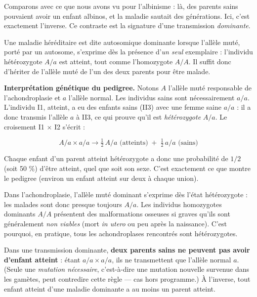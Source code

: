 \documentclass[11pt]{article}
\newcommand{\cle}[1]{{\popxbold\color{popdark}#1}}
\begin{document}
Comparons avec ce que nous avons vu pour l'albinisme : là, des parents sains pouvaient avoir un enfant albinos, et la maladie sautait des générations. Ici, c'est exactement l'inverse. Ce contraste est la signature d'une transmission \emph{dominante}.

\begin{definition}
Une maladie héréditaire est dite \cle{autosomique dominante} lorsque l'allèle muté, porté par un autosome, s'exprime dès la présence d'\emph{un seul} exemplaire : l'individu \cle{hétérozygote} $A/a$ est atteint, tout comme l'homozygote $A/A$. Il suffit donc d'hériter de l'allèle muté de l'un des deux parents pour être malade.
\end{definition}

\textbf{Interprétation génétique du pedigree.} Notons $A$ l'allèle muté responsable de l'achondroplasie et $a$ l'allèle normal. Les individus sains sont nécessairement $a/a$. L'individu I1, atteint, a eu des enfants sains (II3) avec une femme saine $a/a$ : il a donc transmis l'allèle $a$ à II3, ce qui prouve qu'il est \emph{hétérozygote} $A/a$. Le croisement I1 $\times$ I2 s'écrit :

\[ A/a \times a/a \longrightarrow \tfrac{1}{2}\, A/a \text{ (atteints)} \;+\; \tfrac{1}{2}\, a/a \text{ (sains)} \]

Chaque enfant d'un parent atteint hétérozygote a donc une probabilité de $1/2$ (soit 50 \%) d'être atteint, quel que soit son sexe. C'est exactement ce que montre le pedigree (environ un enfant atteint sur deux à chaque union).

\begin{aretenir}
Dans l'achondroplasie, l'allèle muté dominant s'exprime dès l'état \cle{hétérozygote} : les malades sont donc presque toujours $A/a$. Les individus \cle{homozygotes dominants} $A/A$ présentent des malformations osseuses si graves qu'ils sont généralement \emph{non viables} (mort \emph{in utero} ou peu après la naissance). C'est pourquoi, en pratique, tous les achondroplases rencontrés sont hétérozygotes.
\end{aretenir}

\begin{propriete}
Dans une transmission dominante, \textbf{deux parents sains ne peuvent pas avoir d'enfant atteint} : étant $a/a \times a/a$, ils ne transmettent que l'allèle normal $a$. (Seule une \emph{mutation nécessaire}, c'est-à-dire une mutation nouvelle survenue dans les gamètes, peut contredire cette règle — cas hors programme.) À l'inverse, tout enfant atteint d'une maladie dominante a au moins un parent atteint.
\end{propriete}
\end{document}

